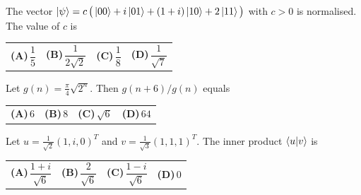 \documentclass[11pt,a4paper]{article}
\newcommand{\optlabel}[1]{\textbf{(#1)}}
\newenvironment{qitem}[1]{\begin{list}{}{\setlength{\leftmargin}{3.3em}\setlength{\labelwidth}{3.1em}%
  \setlength{\labelsep}{0.2em}\setlength{\topsep}{3pt}\setlength{\parsep}{3pt}}\item[\textbf{Q.#1}\hfill]}{\end{list}}
\newcommand{\qsep}{\par\vspace{2pt}{\color{black!15}\hrule}\vspace{4pt}}
\begin{document}
\begin{qitem}{12}
The vector $\ket\psi = c\,\big(\ket{00} + i\ket{01} + (1 + i)\ket{10} + 2\ket{11}\big)$ with $c > 0$ is normalised. The value of $c$ is
\par\smallskip\noindent\begin{tabularx}{\linewidth}{@{}*{4}{L}@{}}
\optlabel{A}\,$\dfrac15$ & \optlabel{B}\,$\dfrac{1}{2\sqrt2}$ & \optlabel{C}\,$\dfrac18$ & \optlabel{D}\,$\dfrac{1}{\sqrt7}$
\end{tabularx}
\end{qitem}
\qsep

\begin{qitem}{13}
Let $g(n) = \tfrac\pi4\sqrt{2^n}$. Then $g(n + 6)/g(n)$ equals
\par\smallskip\noindent\begin{tabularx}{\linewidth}{@{}*{4}{L}@{}}
\optlabel{A}\,$6$ & \optlabel{B}\,$8$ & \optlabel{C}\,$\sqrt6$ & \optlabel{D}\,$64$
\end{tabularx}
\end{qitem}
\qsep

\begin{qitem}{14}
Let $u = \frac{1}{\sqrt2}(1, i, 0)^{T}$ and $v = \frac{1}{\sqrt3}(1, 1, 1)^{T}$. The inner product $\braket{u|v}$ is
\par\smallskip\noindent\begin{tabularx}{\linewidth}{@{}*{4}{L}@{}}
\optlabel{A}\,$\dfrac{1 + i}{\sqrt6}$ & \optlabel{B}\,$\dfrac{2}{\sqrt6}$ & \optlabel{C}\,$\dfrac{1 - i}{\sqrt6}$ & \optlabel{D}\,$0$
\end{tabularx}
\end{qitem}
\qsep
\end{document}
